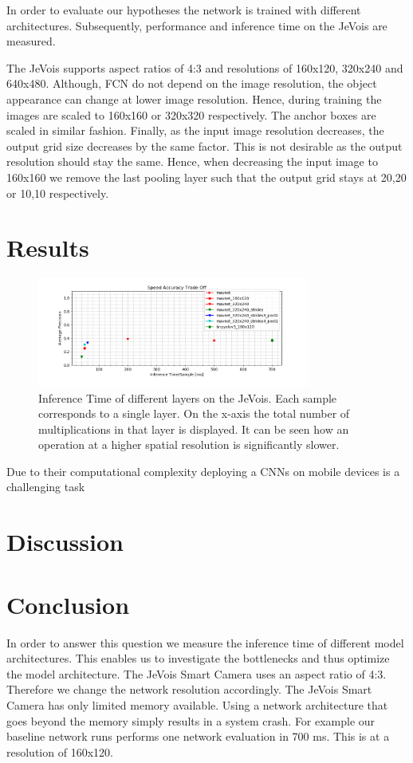 In order to evaluate our hypotheses the network is trained with different architectures. Subsequently, performance and inference time on the JeVois are measured.

The JeVois supports aspect ratios of 4:3 and resolutions of 160x120, 320x240 and 640x480. Although, \ac{FCN} do not depend on the image resolution, the object appearance can change at lower image resolution. Hence, during training the images are scaled to 160x160 or 320x320 respectively. The anchor boxes are scaled in similar fashion. Finally, as the input image resolution decreases, the output grid size decreases by the same factor. This is not desirable as the output resolution should stay the same. Hence, when decreasing the input image to 160x160 we remove the last pooling layer such that the output grid stays at 20,20 or 10,10 respectively.

\section{Results}

\begin{figure}[hbtp]
	\centering
	\includegraphics[width=0.8\textwidth]{fig/ap_speed_tradeoff}
	\caption{Inference Time of different layers on the JeVois. Each sample corresponds to a single layer. On the x-axis the total number of multiplications in that layer is displayed. It can be seen how an operation at a higher spatial resolution is significantly slower.}
	\label{fig:ap_speed_tradeoff}
\end{figure}

Due to their computational complexity deploying a \acp{CNN} on mobile devices is a challenging task

\section{Discussion}

\section{Conclusion}


In order to answer this question we measure the inference time of different model architectures. This enables us to investigate the bottlenecks and thus optimize the model architecture. The JeVois Smart Camera uses an aspect ratio of 4:3. Therefore we change the network resolution accordingly. The JeVois Smart Camera has only limited memory available. Using a network architecture that goes beyond the memory simply results in a system crash. For example our baseline network runs performs one network evaluation in 700 ms. This is at a resolution of 160x120.




